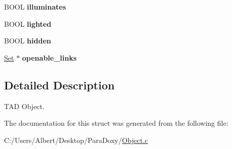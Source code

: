 \begin{DoxyCompactItemize}
\item 
\hypertarget{struct___object_a2b4ab5b0fe2674850d81f40923916d31}{B\-O\-O\-L {\bfseries illuminates}}\label{struct___object_a2b4ab5b0fe2674850d81f40923916d31}

\item 
\hypertarget{struct___object_aadad4b023df75155e9bca722565bbdec}{B\-O\-O\-L {\bfseries lighted}}\label{struct___object_aadad4b023df75155e9bca722565bbdec}

\item 
\hypertarget{struct___object_a44824966fc9f4d5f82c189b2e063ddc4}{B\-O\-O\-L {\bfseries hidden}}\label{struct___object_a44824966fc9f4d5f82c189b2e063ddc4}

\item 
\hypertarget{struct___object_ac820f0ca6ffcedadf32c15bd0b535753}{\hyperlink{struct___set}{Set} $\ast$ {\bfseries openable\-\_\-links}}\label{struct___object_ac820f0ca6ffcedadf32c15bd0b535753}

\end{DoxyCompactItemize}


\subsection{Detailed Description}
T\-A\-D Object. 


\begin{DoxyItemize}
\item 
\end{DoxyItemize}

The documentation for this struct was generated from the following file\-:\begin{DoxyCompactItemize}
\item 
C\-:/\-Users/\-Albert/\-Desktop/\-Para\-Doxy/\hyperlink{_object_8c}{Object.\-c}\end{DoxyCompactItemize}
